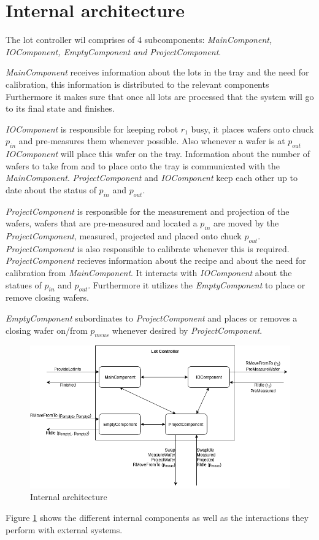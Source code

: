 \section{Internal architecture}
The lot controller wil comprises of 4 subcomponents: \textit{MainComponent, IOComponent, EmptyComponent and ProjectComponent}.

\textit{MainComponent} receives information about the lots in the tray and the need for calibration, this information is distributed to the relevant components Furthermore it makes sure that once all lots are processed that the system will go to its final state and finishes.

\textit{IOComponent} is responsible for keeping robot $r_1$ busy, it places wafers onto chuck $p_{in}$ and pre-measures them whenever possible. Also whenever a wafer is at $p_{out}$ \textit{IOComponent} will place this wafer on the tray. Information about the number of wafers to take from and to place onto the tray is communicated with the \textit{MainComponent}. \textit{ProjectComponent} and \textit{IOComponent} keep each other up to date about the status of $p_{in}$ and $p_{out}$.

\textit{ProjectComponent} is responsible for the measurement and projection of the wafers, wafers that are pre-measured and located a $p_{in}$ are moved by the \textit{ProjectComponent}, measured, projected and placed onto chuck $p_{out}$. \textit{ProjectComponent} is also responsible to calibrate whenever this is required. \textit{ProjectComponent} recieves information about the recipe and about the need for calibration from \textit{MainComponent}. It interacts with \textit{IOComponent} about the statues of $p_{in}$ and $p_{out}$. Furthermore it utilizes the \textit{EmptyComponent} to place or remove closing wafers.

\textit{EmptyComponent} subordinates to \textit{ProjectComponent} and places or removes a closing wafer on/from $p_{meas}$ whenever desired by \textit{ProjectComponent}.\\

\begin{figure}
	\includegraphics[width=\textwidth]{img/internal_architecture.png}
    \caption{Internal architecture}
    \label{fig:internal_arch}
\end{figure}
Figure \ref{fig:internal_arch} shows the different internal components as well as the interactions they perform with external systems. 

